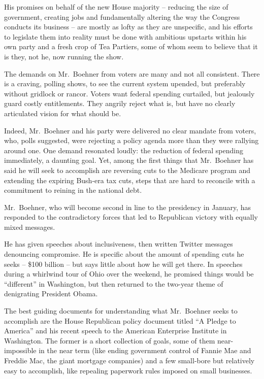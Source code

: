﻿\documentclass[12pt]{article}
\begin{document}
His promises on behalf of the new House majority -- reducing the size of government, creating jobs
and fundamentally altering the way the Congress conducts its business -- are mostly as lofty as they
are unspecific, and his efforts to legislate them into reality must be done with ambitious upstarts
within his own party and a fresh crop of Tea Partiers, some of whom seem to believe that it is they,
not he, now running the show.

The demands on Mr.~Boehner from voters are many and not all consistent. There is a craving, polling
shows, to see the current system upended, but preferably without gridlock or rancor. Voters want
federal spending curtailed, but jealously guard costly entitlements. They angrily reject what is,
but have no clearly articulated vision for what should be.

Indeed, Mr.~Boehner and his party were delivered no clear mandate from voters, who, polls suggested,
were rejecting a policy agenda more than they were rallying around one. One demand resonated loudly:
the reduction of federal spending immediately, a daunting goal. Yet, among the first things that
Mr.~Boehner has said he will seek to accomplish are reversing cuts to the Medicare program and
extending the expiring Bush-era tax cuts, steps that are hard to reconcile with a commitment to
reining in the national debt.

Mr.~Boehner, who will become second in line to the presidency in January, has responded to the
contradictory forces that led to Republican victory with equally mixed messages.

He has given speeches about inclusiveness, then written Twitter messages denouncing compromise. He
is specific about the amount of spending cuts he seeks -- \$100 billion -- but says little about how
he will get there. In speeches during a whirlwind tour of Ohio over the weekend, he promised things
would be ``different'' in Washington, but then returned to the two-year theme of denigrating
President Obama.

The best guiding documents for understanding what Mr.~Boehner seeks to accomplish are the House
Republican policy document titled ``A Pledge to America'' and his recent speech to the American
Enterprise Institute in Washington. The former is a short collection of goals, some of them
near-impossible in the near term (like ending government control of Fannie Mae and Freddie Mac, the
giant mortgage companies) and a few small-bore but relatively easy to accomplish, like repealing
paperwork rules imposed on small businesses.
\end{document}
